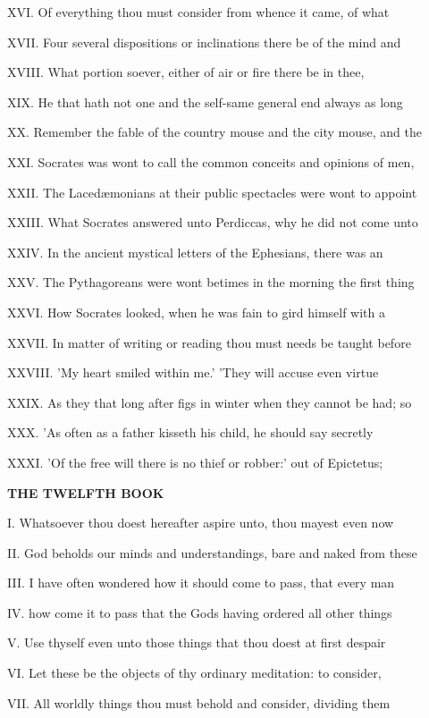 XVI. Of everything thou must consider from
whence it came, of what

XVII. Four several dispositions or
inclinations there be of the mind and

XVIII. What portion soever, either of air or
fire there be in thee,

XIX. He that hath not one and the self-same
general end always as long

XX. Remember the fable of the country mouse
and the city mouse, and the

XXI. Socrates was wont to call the common
conceits and opinions of men,

XXII. The Lacedæmonians at their public
spectacles were wont to appoint

XXIII. What Socrates answered unto Perdiccas,
why he did not come unto

XXIV. In the ancient mystical letters of the
Ephesians, there was an

XXV. The Pythagoreans were wont betimes in the
morning the first thing

XXVI. How Socrates looked, when he was fain to
gird himself with a

XXVII. In matter of writing or reading thou
must needs be taught before

XXVIII. 'My heart smiled within me.' 'They
will accuse even virtue

XXIX. As they that long after figs in winter
when they cannot be had; so

XXX. 'As often as a father kisseth his child,
he should say secretly

XXXI. 'Of the free will there is no thief or
robber:' out of Epictetus;

\textbf{THE TWELFTH BOOK}

I. Whatsoever thou doest hereafter aspire
unto, thou mayest even now

II. God beholds our minds and understandings,
bare and naked from these

III. I have often wondered how it should come
to pass, that every man

IV. how come it to pass that the Gods having
ordered all other things

V. Use thyself even unto those things that
thou doest at first despair

VI. Let these be the objects of thy ordinary
meditation: to consider,

VII. All worldly things thou must behold and
consider, dividing them

